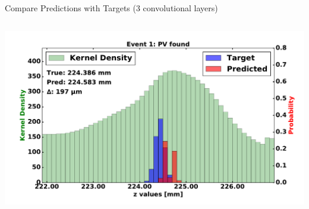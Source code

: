 \begin{frame}{Compare Predictions with Targets (3 convolutional layers)}
\begin{columns}[c]
\begin{center}
           \includegraphics[width=1\textwidth, height=0.45\textwidth, trim=18 0 18 0]{images/120000_3layer_11.pdf}
       \end{center}
  \end{columns}
\end{frame}

